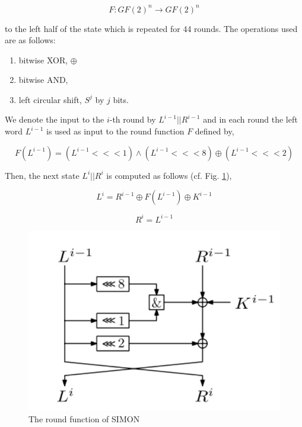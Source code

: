 \begin{equation}
F:GF(2)^n\rightarrow GF(2)^n
\end{equation}

to the left half of the state which is repeated for 44 rounds.
The operations used are as follows:

\begin{enumerate}
	\item bitwise XOR, $\oplus$
	\item bitwise AND,
	\item left circular shift, $S^j$ by $j$ bits.
\end{enumerate}

We denote the input to the $i$-th round by $L^{i-1}||R^{i-1}$
and in each round the left word $L^{i-1}$ is used as input
to the round function $F$ defined by,

\begin{equation}
F(L^{i-1})=(L^{i-1}<<<1)\wedge(L^{i-1}<<<8)\oplus(L^{i-1}<<<2)
\end{equation}

Then, the next state $L^{i}||R^{i}$ is computed as follows
(cf. Fig. \ref{fig:SIMONroundfn}),

\begin{equation}
L^i=R^{i-1}\oplus F(L^{i-1})\oplus K^{i-1}
\end{equation}

\begin{equation}
R^i=L^{i-1}
\end{equation}


\begin{figure}[!h]
	\vspace{-0.2cm}
	\centering
	\includegraphics[width=120mm]{./pics/SIMONroundfn-eps-converted-to.pdf}
	\caption{The round function of SIMON}
	\label{fig:SIMONroundfn}
	\vspace{-0.1cm}
\end{figure}


